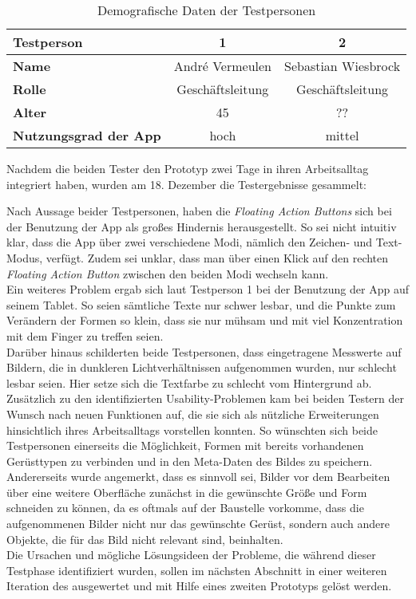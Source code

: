\begin{table}[h]
  \centering
  \begin{tabular}{l | c | c}
    \hline
    \textbf{Testperson} & \textbf{1} & \textbf{2} \\
    \hline
    \textbf{Name} & André Vermeulen & Sebastian Wiesbrock \\
    \hline
    \textbf{Rolle} & Geschäftsleitung & Geschäftsleitung \\
    \hline
    \textbf{Alter} & 45 &  ?? \\
    \hline
    \textbf{Nutzungsgrad der App} & hoch & mittel \\
    \hline
  \end{tabular}
  \caption{Demografische Daten der Testpersonen}
  \label{table:testers}
\end{table}

Nachdem die beiden Tester den Prototyp zwei Tage in ihren Arbeitsalltag integriert haben, wurden am 18. Dezember die Testergebnisse gesammelt:

Nach Aussage beider Testpersonen, haben die \emph{Floating Action Buttons} sich bei der Benutzung der App als großes Hindernis herausgestellt.
So sei nicht intuitiv klar, dass die App über zwei verschiedene Modi, nämlich den Zeichen- und Text-Modus, verfügt.
Zudem sei unklar, dass man über einen Klick auf den rechten \emph{Floating Action Button} zwischen den beiden Modi wechseln kann. \\

Ein weiteres Problem ergab sich laut Testperson 1 bei der Benutzung der App auf seinem Tablet.
So seien sämtliche Texte nur schwer lesbar, und die Punkte zum Verändern der Formen so klein, dass sie nur mühsam und mit viel Konzentration mit dem Finger zu treffen seien. \\

Darüber hinaus schilderten beide Testpersonen, dass eingetragene Messwerte auf Bildern, die in dunkleren Lichtverhältnissen aufgenommen wurden, nur schlecht lesbar seien.
Hier setze sich die Textfarbe zu schlecht vom Hintergrund ab. \\

Zusätzlich zu den identifizierten Usability-Problemen kam bei beiden Testern der Wunsch nach neuen Funktionen auf, die sie sich als nützliche Erweiterungen hinsichtlich ihres Arbeitsalltags vorstellen konnten.
So wünschten sich beide Testpersonen einerseits die Möglichkeit, Formen mit bereits vorhandenen Gerüsttypen zu verbinden und in den Meta-Daten des Bildes zu speichern.
Andererseits wurde angemerkt, dass es sinnvoll sei, Bilder vor dem Bearbeiten über eine weitere Oberfläche zunächst in die gewünschte Größe und Form schneiden zu können, da es oftmals auf der Baustelle vorkomme, dass die aufgenommenen Bilder nicht nur das gewünschte Gerüst, sondern auch andere Objekte, die für das Bild nicht relevant sind, beinhalten. \\

Die Ursachen und mögliche Lösungsideen der Probleme, die während dieser Testphase identifiziert wurden, sollen im nächsten Abschnitt in einer weiteren Iteration des \hcdp{} ausgewertet und mit Hilfe eines zweiten Prototyps gelöst werden.
